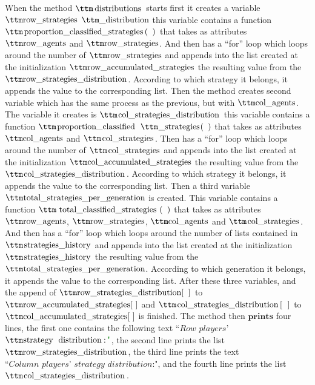 When the method $\pythoninline{distributions}$ starts first it creates a variable $\pythoninline{row\_strategies}$ $\pythoninline{\_distribution}$ this variable contains a function $\pythoninline{proportion\_classified\_strategies( )}$ that takes as attributes $\pythoninline{row\_agents}$ and $\pythoninline{row\_strategies}$. And then has a ``for'' loop which loops around the number of  $\pythoninline{row\_strategies}$ and appends into the list created at the initialization $\pythoninline{row\_accumulated\_strategies}$ the resulting value from the $\pythoninline{row\_strategies\_distribution}$. According to which strategy it belongs, it appends the value to the corresponding list. 
Then the method creates second variable which has the same process as the previous, but with $\pythoninline{col\_agents}$. The variable it creates is $\pythoninline{col\_strategies\_distribution}$ this variable contains a function $\pythoninline{proportion\_classified}$ $\pythoninline{\_strategies( )}$ that takes as attributes $\pythoninline{col\_agents}$ and $\pythoninline{col\_strategies}$. Then has a ``for'' loop which loops around the number of  $\pythoninline{col\_strategies}$ and appends into the list created at the initialization $\pythoninline{col\_accumulated\_strategies}$ the resulting value from the $\pythoninline{col\_strategies\_distribution}$. According to which strategy it belongs, it appends the value to the corresponding list.  Then a third variable  $\pythoninline{total\_strategies\_per\_generation}$ is created. This variable contains a function $\pythoninline{total\_classified\_strategies( )}$ that takes as attributes $\pythoninline{row\_agents}$, $\pythoninline{row\_strategies}$, $\pythoninline{col\_agents}$ and $\pythoninline{col\_strategies}$. And then has a ``for'' loop which loops around the number of lists contained in  $\pythoninline{strategies\_history}$ and appends into the list created at the initialization $\pythoninline{strategies\_history}$ the resulting value from the $\pythoninline{total\_strategies\_per\_generation}$. According to which generation it belongs, it appends the value to the corresponding list. After these three variables, and the append of $\pythoninline{row\_strategies\_distribution[  ]}$ to $\pythoninline{row\_accumulated\_strategies[  ]}$ and $\pythoninline{col\_strategies\_distribution[  ]}$ to $\pythoninline{col\_accumulated\_strategies[  ]}$ is finished. The method then $\textbf{prints}$ four lines, the first one contains the following text $\textit{``Row players'}$ $\pythoninline{strategy distribution:"}$, the second line prints the list $\pythoninline{row\_strategies\_distribution}$, the third line prints the text $\textit{``Column players' strategy distribution:"}$, and the fourth line prints the list $\pythoninline{col\_strategies\_distribution}$. 
